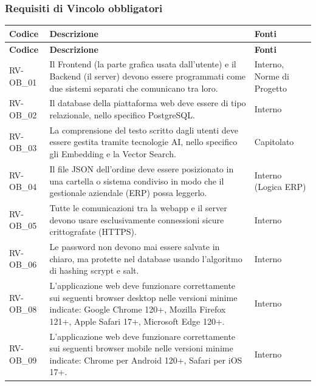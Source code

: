 \subsubsection{Requisiti di Vincolo obbligatori}
\renewcommand{\arraystretch}{1.15}
\begin{longtable}{|>{\raggedright}p{}|>{\raggedright\arraybackslash}p{}|>{\raggedright\arraybackslash}p{}|}
    \hline
    \rowcolor[gray]{0.9}
    \textbf{Codice} & \textbf{Descrizione} & \textbf{Fonti} \\
    \hline
    \endfirsthead
    \hline
    \rowcolor[gray]{0.9}
    \textbf{Codice} & \textbf{Descrizione} & \textbf{Fonti} \\
    \hline
    \endhead
    \hline
    RV-OB\_01 \hypertarget{rv-ob_1} & Il Frontend (la parte grafica usata dall'utente) e il Backend (il server) devono essere programmati come due sistemi separati che comunicano tra loro. & Interno, Norme di Progetto \\
    \hline
    RV-OB\_02 \hypertarget{rv-ob_2} & Il database della piattaforma web deve essere di tipo relazionale, nello specifico PostgreSQL. & Interno \\
    \hline
    RV-OB\_03 \hypertarget{rv-ob_3} & La comprensione del testo scritto dagli utenti deve essere gestita tramite tecnologie AI, nello specifico gli Embedding e la Vector Search. & Capitolato \\
    \hline
    RV-OB\_04 \hypertarget{rv-ob_4} & Il file JSON dell'ordine deve essere posizionato in una cartella o sistema condiviso in modo che il gestionale aziendale (ERP) possa leggerlo. & Interno (Logica ERP) \\
    \hline
    RV-OB\_05 \hypertarget{rv-ob_5} & Tutte le comunicazioni tra la webapp e il server devono usare esclusivamente connessioni sicure crittografate (HTTPS). & Interno \\
    \hline
    RV-OB\_06 \hypertarget{rv-ob_6} & Le password non devono mai essere salvate in chiaro, ma protette nel database usando l'algoritmo di hashing scrypt e salt. & Interno \\
    \hline
    RV-OB\_08 \hypertarget{rv-ob_8} & L'applicazione web deve funzionare correttamente sui seguenti browser desktop nelle versioni minime indicate: Google Chrome 120+, Mozilla Firefox 121+, Apple Safari 17+, Microsoft Edge 120+. & Interno \\
    \hline
    RV-OB\_09 \hypertarget{rv-ob_9} & L'applicazione web deve funzionare correttamente sui seguenti browser mobile nelle versioni minime indicate: Chrome per Android 120+, Safari per iOS 17+. & Interno \\

\end{longtable}
